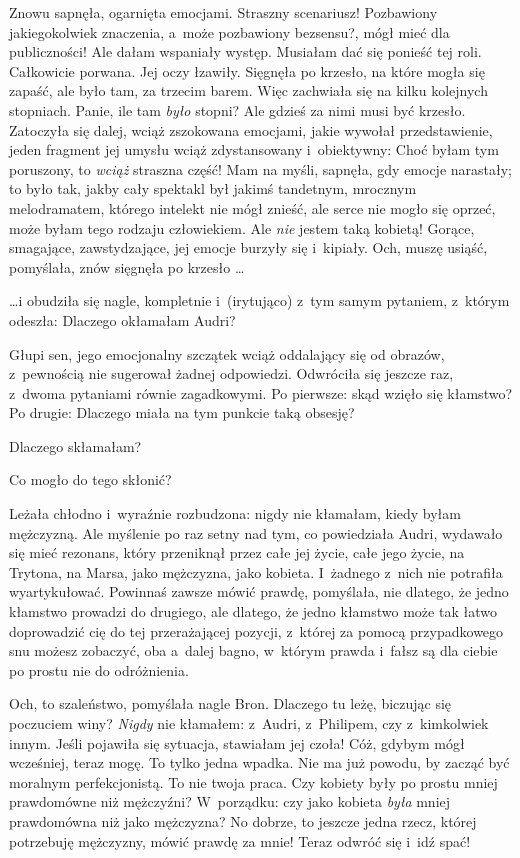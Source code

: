 \documentclass[oneside,polish,11pt,rmheadings]{mwbk}
\begin{document}
Znowu sapnęła, ogarnięta emocjami. Straszny scenariusz! Pozbawiony jakiegokolwiek znaczenia, a~może pozbawiony bezsensu?, mógł mieć dla publiczności! Ale dałam wspaniały występ. Musiałam dać się ponieść tej roli. Całkowicie porwana. Jej oczy łzawiły. Sięgnęła po krzesło, na które mogła się zapaść, ale było tam, za trzecim barem. Więc zachwiała się na kilku kolejnych stopniach. Panie, ile tam  \textit{było }stopni? Ale gdzieś za nimi musi być krzesło. Zatoczyła się dalej, wciąż zszokowana emocjami, jakie wywołał przedstawienie, jeden fragment jej umysłu wciąż zdystansowany i~obiektywny: Choć byłam tym poruszony, to \textit{wciąż }straszna część! Mam na myśli, sapnęła, gdy emocje narastały; to było tak, jakby cały spektakl był jakimś tandetnym, mrocznym melodramatem, którego intelekt nie mógł znieść, ale serce nie mogło się oprzeć, może byłam tego rodzaju człowiekiem. Ale \textit{nie }jestem taką kobietą! Gorące, smagające, zawstydzające, jej emocje burzyły się i~kipiały. Och, muszę usiąść, pomyślała, znów sięgnęła po krzesło \ldots  

 \ldots i obudziła się nagle, kompletnie i~(irytująco) z~tym samym pytaniem, z~którym odeszła: Dlaczego okłamałam Audri? 

Głupi sen, jego emocjonalny szczątek wciąż oddalający się od obrazów, z~pewnością nie sugerował żadnej odpowiedzi. Odwróciła się jeszcze raz, z~dwoma pytaniami równie zagadkowymi. Po pierwsze: skąd wzięło się kłamstwo? Po drugie: Dlaczego miała na tym punkcie taką obsesję? 

Dlaczego skłamałam? 

Co mogło do tego skłonić? 

Leżała chłodno i~wyraźnie rozbudzona: nigdy nie kłamałam, kiedy byłam mężczyzną. Ale myślenie po raz setny nad tym, co powiedziała Audri, wydawało się mieć rezonans, który przeniknął przez całe jej życie, całe jego życie, na Trytona, na Marsa, jako mężczyzna, jako kobieta. I~żadnego z~nich nie potrafiła wyartykułować. Powinnaś zawsze mówić prawdę, pomyślała, nie dlatego, że jedno kłamstwo prowadzi do drugiego, ale dlatego, że jedno kłamstwo może tak łatwo doprowadzić cię do tej przerażającej pozycji, z~której za pomocą przypadkowego snu możesz zobaczyć, oba a~dalej bagno, w~którym prawda i~fałsz są dla ciebie po prostu nie do odróżnienia. 

Och, to szaleństwo, pomyślała nagle Bron. Dlaczego tu leżę, biczując się poczuciem winy? \textit{Nigdy }nie kłamałem: z~Audri, z~Philipem, czy z~kimkolwiek innym. Jeśli pojawiła się sytuacja, stawiałam jej czoła! Cóż, gdybym mógł wcześniej, teraz mogę. To tylko jedna wpadka. Nie ma już powodu, by zacząć być moralnym perfekcjonistą. To nie twoja praca. Czy kobiety były po prostu mniej prawdomówne niż mężczyźni? W~porządku: czy jako kobieta \textit{była }mniej prawdomówna niż jako mężczyzna? No dobrze, to jeszcze jedna rzecz, której potrzebuję mężczyzny, mówić prawdę za mnie! Teraz odwróć się i~idź spać! 
\end{document}

